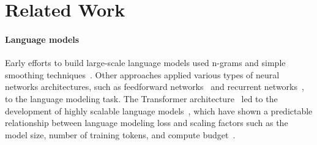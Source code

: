 \documentclass[10pt]{article} %
\begin{document}
\section{Related Work}
\paragraph{Language models} 
Early efforts to build large-scale language models used n-grams and simple smoothing techniques~\citep{brants2007large,heafield2013scalable,buck2014n}. Other approaches applied various types of neural networks architectures, such as feedforward networks~\citep{bengio2000neural} and recurrent  networks~\citep{mikolov2010recurrent,jozefowicz2016exploring}, to the language modeling task. 
The Transformer architecture~\citep{vaswani2017attention}
led to the development of 
highly scalable language models~\citep{radford2019language,brown2020language}, which have shown a predictable relationship between language modeling loss and scaling factors such as the model size, number of training tokens, and compute budget~\citep{kaplan2020scaling,hoffmann2022training}. %
\end{document}
